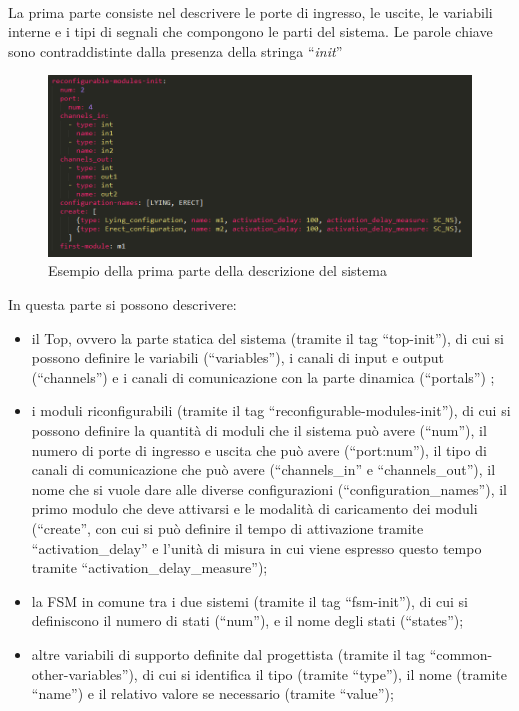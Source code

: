 \documentclass[a4paper,titlepage]{book}
\begin{document}
~ 

La prima parte consiste nel descrivere le porte di ingresso, le uscite, le variabili interne e i tipi di segnali che compongono le parti del sistema. Le parole chiave sono contraddistinte dalla presenza della stringa ``\textit{init}''

\begin{figure}[!ht]
\centering
\includegraphics[scale=0.6]{pyngu_init_example.png}
\caption{Esempio della prima parte della descrizione del sistema}\label{fig:10}
\end{figure}

In questa parte si possono descrivere: 
\begin{itemize}

\item il Top, ovvero la parte statica del sistema (tramite il tag ``top-init''), di cui si possono definire le variabili (``variables''), i canali di input e output (``channels'') e i canali di comunicazione con la parte dinamica (``portals'') ;

\item i moduli riconfigurabili (tramite il tag ``reconfigurable-modules-init''), di cui si possono definire la quantità di moduli che il sistema può avere (``num''), il numero di porte di ingresso e uscita che può avere (``port:num''), il tipo di canali di comunicazione che può avere (``channels\_in'' e ``channels\_out''), il nome che si vuole dare alle diverse configurazioni (``configuration\_names''), il primo modulo che deve attivarsi e le modalità di caricamento dei moduli (``create'', con cui si può definire il tempo di attivazione tramite ``activation\_delay'' e l'unità di misura in cui viene espresso questo tempo tramite ``activation\_delay\_measure'');

\item la FSM in comune tra i due sistemi (tramite il tag ``fsm-init''), di cui si definiscono il numero di stati (``num''), e il nome degli stati (``states'');

\item altre variabili di supporto definite dal progettista (tramite il tag ``common-other-variables''), di cui si identifica il tipo (tramite ``type''),  il nome (tramite ``name'') e il relativo valore se necessario (tramite ``value'');

\end{itemize}
\end{document}
